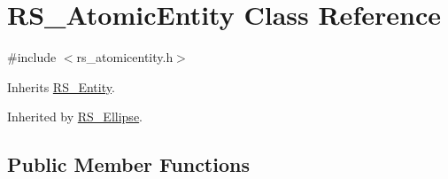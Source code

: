 \hypertarget{class_r_s___atomic_entity}{\section{R\-S\-\_\-\-Atomic\-Entity Class Reference}
\label{class_r_s___atomic_entity}
}


{\ttfamily \#include $<$rs\-\_\-atomicentity.\-h$>$}



Inherits \hyperlink{class_r_s___entity}{R\-S\-\_\-\-Entity}.



Inherited by \hyperlink{class_r_s___ellipse}{R\-S\-\_\-\-Ellipse}.

\subsection*{Public Member Functions}
